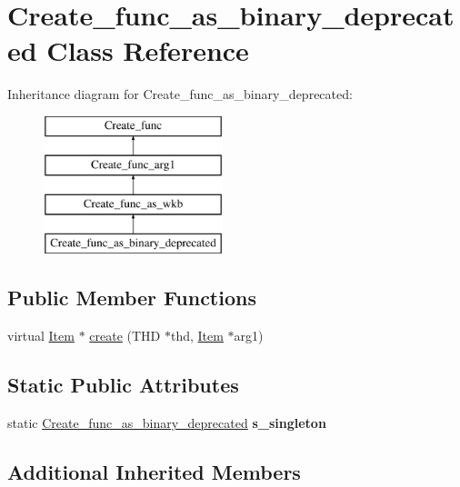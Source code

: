 \hypertarget{classCreate__func__as__binary__deprecated}{}\section{Create\+\_\+func\+\_\+as\+\_\+binary\+\_\+deprecated Class Reference}
\label{classCreate__func__as__binary__deprecated}
Inheritance diagram for Create\+\_\+func\+\_\+as\+\_\+binary\+\_\+deprecated\+:\begin{figure}[H]
\begin{center}
\leavevmode
\includegraphics[height=4.000000cm]{classCreate__func__as__binary__deprecated}
\end{center}
\end{figure}
\subsection*{Public Member Functions}
\begin{DoxyCompactItemize}
\item 
virtual \mbox{\hyperlink{classItem}{Item}} $\ast$ \mbox{\hyperlink{classCreate__func__as__binary__deprecated_a26266523ce60462f787514813b40e9af}{create}} (T\+HD $\ast$thd, \mbox{\hyperlink{classItem}{Item}} $\ast$arg1)
\end{DoxyCompactItemize}
\subsection*{Static Public Attributes}
\begin{DoxyCompactItemize}
\item 
\mbox{\label{classCreate__func__as__binary__deprecated_af25925c950b3490255953237c706fddb}} 
static \mbox{\hyperlink{classCreate__func__as__binary__deprecated}{Create\+\_\+func\+\_\+as\+\_\+binary\+\_\+deprecated}} {\bfseries s\+\_\+singleton}
\end{DoxyCompactItemize}
\subsection*{Additional Inherited Members}


